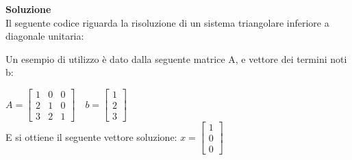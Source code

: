 \large\noindent{}
\begin{flushleft}
	\large \textbf{Soluzione}\\[0.5cm]
	Il seguente codice riguarda la risoluzione di un sistema triangolare inferiore a diagonale unitaria:
	
	Un esempio di utilizzo è dato dalla seguente matrice A, e vettore dei termini noti b:\\
		\begin{center}
			$A = \begin{bmatrix}
				1 & 0 & 0\\
				2 & 1 & 0\\
				3 & 2 & 1
			\end{bmatrix}\quad
			b = \begin{bmatrix}
				1\\
				2\\
				3\end{bmatrix}$\\
				E si ottiene il seguente vettore soluzione:
					$x = \begin{bmatrix}
					1\\
					0\\
					0\end{bmatrix}$\\
			\end{center}
\end{flushleft}